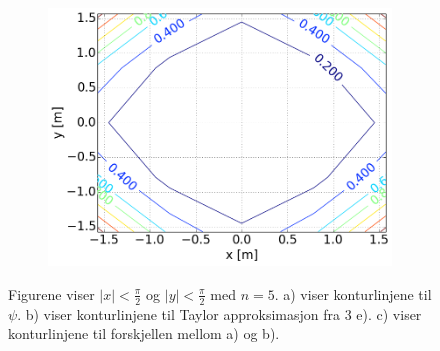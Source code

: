 \begin{figure}[H]
\begin{subfigure}{0.3\textwidth}
        \caption{}
    \end{subfigure}
    ~
    \begin{subfigure}{0.3\textwidth}
        \centering
        \includegraphics[width=\linewidth]{../4a_2_0,5_5.png}
        \caption{}
    \end{subfigure}
    \caption{Figurene viser $|x| < \frac{\pi}{2}$ og
    $|y| < \frac{\pi}{2}$ med $n = 5$.
    \color{blue} a) \color{black}
     viser konturlinjene
    til $\psi$.
    \color{blue} b) \color{black}
     viser konturlinjene til Taylor approksimasjon
    fra 3 e).
    \color{blue} c) \color{black}
     viser konturlinjene til forskjellen mellom a) og b). }
    \label{fig_4a_first}
\end{figure}


